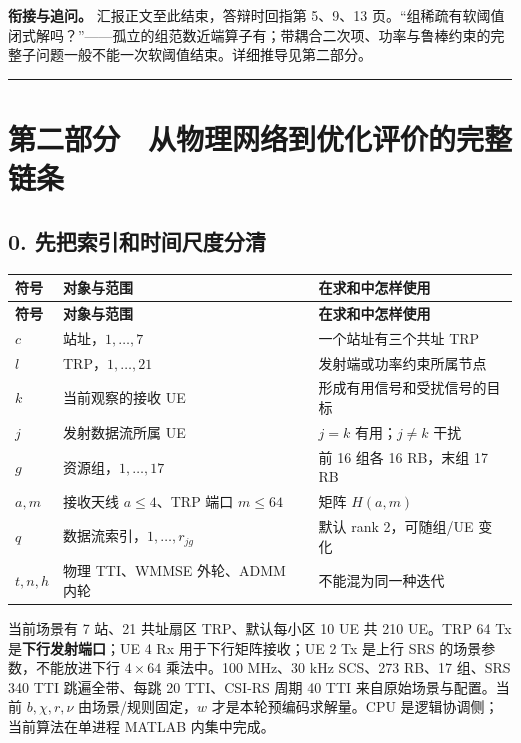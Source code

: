 \documentclass[11pt,a4paper]{ctexart}
\begin{document}
\textbf{衔接与追问。} 汇报正文至此结束，答辩时回指第 5、9、13 页。“组稀疏有软阈值闭式解吗？”——孤立的组范数近端算子有；带耦合二次项、功率与鲁棒约束的完整子问题一般不能一次软阈值结束。详细推导见第二部分。\par

\par\medskip\hrule\medskip

\clearpage\section*{第二部分　从物理网络到优化评价的完整链条}

\subsection*{0. 先把索引和时间尺度分清}

\begin{small}
\begin{longtable}{|p{}|p{}|p{}|}
\hline
\textbf{符号} & \textbf{对象与范围} & \textbf{在求和中怎样使用} \\ \hline
\endfirsthead
\hline \textbf{符号} & \textbf{对象与范围} & \textbf{在求和中怎样使用} \\ \hline
\endhead
$c$ & 站址，$1,\ldots,7$ & 一个站址有三个共址 TRP \\ \hline
$l$ & TRP，$1,\ldots,21$ & 发射端或功率约束所属节点 \\ \hline
$k$ & 当前观察的接收 UE & 形成有用信号和受扰信号的目标 \\ \hline
$j$ & 发射数据流所属 UE & $j=k$ 有用；$j\ne k$ 干扰 \\ \hline
$g$ & 资源组，$1,\ldots,17$ & 前 16 组各 16 RB，末组 17 RB \\ \hline
$a,m$ & 接收天线 $a\le4$、TRP 端口 $m\le64$ & 矩阵 $H(a,m)$ \\ \hline
$q$ & 数据流索引，$1,\ldots,r_{jg}$ & 默认 rank 2，可随组/UE 变化 \\ \hline
$t,n,h$ & 物理 TTI、WMMSE 外轮、ADMM 内轮 & 不能混为同一种迭代 \\ \hline
\end{longtable}
\end{small}

当前场景有 7 站、21 共址扇区 TRP、默认每小区 10 UE 共 210 UE。TRP 64 Tx 是\textbf{下行发射端口}；UE 4 Rx 用于下行矩阵接收；UE 2 Tx 是上行 SRS 的场景参数，不能放进下行 $4\times64$ 乘法中。100 MHz、30 kHz SCS、273 RB、17 组、SRS 340 TTI 跳遍全带、每跳 20 TTI、CSI-RS 周期 40 TTI 来自原始场景与配置。当前 $b,\chi,r,\nu$ 由场景/规则固定，$w$ 才是本轮预编码求解量。CPU 是逻辑协调侧；当前算法在单进程 MATLAB 内集中完成。\par
\end{document}
